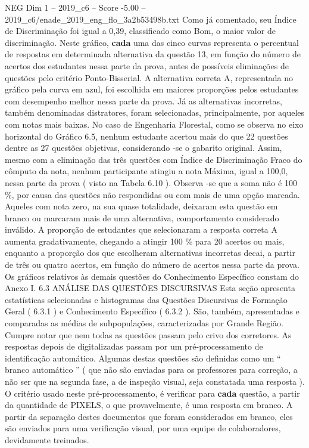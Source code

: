 \begin{textsample}{NEG Dim 1 – 2019\_c6 – Score -5.00 – 2019\_c6/enade\_2019\_eng\_flo\_3a2b53498b.txt}
Como já comentado, seu Índice de Discriminação foi igual a 0,39, classificado como Bom, o maior valor de discriminação.
Neste gráfico, \textbf{cada} uma das cinco curvas representa o percentual de respostas em determinada alternativa da questão 13, em função do número de acertos dos estudantes nessa parte da prova, antes de possíveis eliminações de questões pelo critério Ponto-Bisserial.
A alternativa correta A, representada no gráfico pela curva em azul, foi escolhida em maiores proporções pelos estudantes com desempenho melhor nessa parte da prova.
Já as alternativas incorretas, também denominadas distratores, foram selecionadas, principalmente, por aqueles com notas mais baixas.
No caso de Engenharia Florestal, como se observa no eixo horizontal do Gráfico 6.5, nenhum estudante acertou mais do que 22 questões dentre as 27 questões objetivas, considerando -se o gabarito original.
Assim, mesmo com a eliminação das três questões com Índice de Discriminação Fraco do cômputo da nota, nenhum participante atingiu a nota Máxima, igual a 100,0, nessa parte da prova ( visto na Tabela 6.10 ).
Observa -se que a soma não é 100 \%, por causa das questões não respondidas ou com mais de uma opção marcada.
Aqueles com nota zero, na sua quase totalidade, deixaram esta questão em branco ou marcaram mais de uma alternativa, comportamento considerado inválido.
A proporção de estudantes que selecionaram a resposta correta A aumenta gradativamente, chegando a atingir 100 \% para 20 acertos ou mais, enquanto a proporção dos que escolheram alternativas incorretas decai, a partir de três ou quatro acertos, em função do número de acertos nessa parte da prova.
Os gráficos relativos às demais questões do Conhecimento Específico constam do Anexo I. 6.3 ANÁLISE DAS QUESTÕES DISCURSIVAS Esta seção apresenta estatísticas selecionadas e histogramas das Questões Discursivas de Formação Geral ( 6.3.1 ) e Conhecimento Específico ( 6.3.2 ).
São, também, apresentadas e comparadas as médias de subpopulações, caracterizadas por Grande Região.
Cumpre notar que nem todas as questões passam pelo crivo dos corretores.
As respostas depois de digitalizadas passam por um pré-processamento de identificação automático.
Algumas destas questões são definidas como um “ branco automático ” ( que não são enviadas para os professores para correção, a não ser que na segunda fase, a de inspeção visual, seja constatada uma resposta ).
O critério usado neste pré-processamento, é verificar para \textbf{cada} questão, a partir da quantidade de PIXELS, o que provavelmente, é uma resposta em branco.
A partir da separação destes documentos que foram considerados em branco, eles são enviados para uma verificação visual, por uma equipe de colaboradores, devidamente treinados.

\end{textsample}
